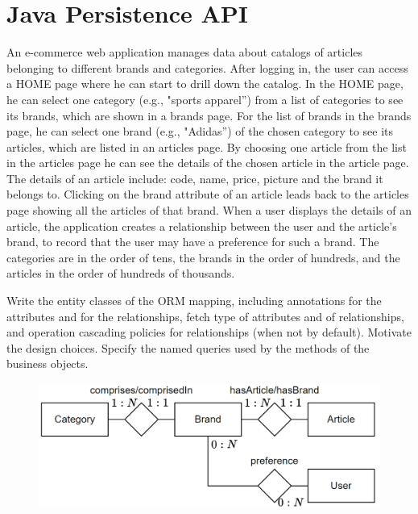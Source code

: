 \section{Java Persistence API}

An e-commerce web application manages data about catalogs of articles belonging to different brands and categories. 
After logging in, the user can access a HOME page where he can start to drill down the catalog. 
In the HOME page, he can select one category (e.g., "sports apparel”) from a list of categories to see its brands, which are shown in a brands page. 
For the list of brands in the brands page, he can select one brand (e.g., "Adidas”) of the chosen category to see its articles, which are listed in an articles page.
By choosing one article from the list in the articles page he can see the details of the chosen article in the article page. 
The details of an article include: code, name, price, picture and the brand it belongs to.
Clicking on the brand attribute of an article leads back to the articles page showing all the articles of that brand. 
When a user displays the details of an article, the application creates a relationship between the user and the article's brand, to record that the user may have a preference for such a brand.
The categories are in the order of tens, the brands in the order of hundreds, and the articles in the order of hundreds of thousands. 

Write the entity classes of the ORM mapping, including annotations for the attributes and for the relationships, fetch type of attributes and of relationships, and operation cascading policies for relationships (when not by default). 
Motivate the design choices. 
Specify the named queries used by the methods of the business objects.
\begin{figure}[H]
    \centering
    \includegraphics[width=0.6\linewidth]{images/jpa1.png}
\end{figure}

